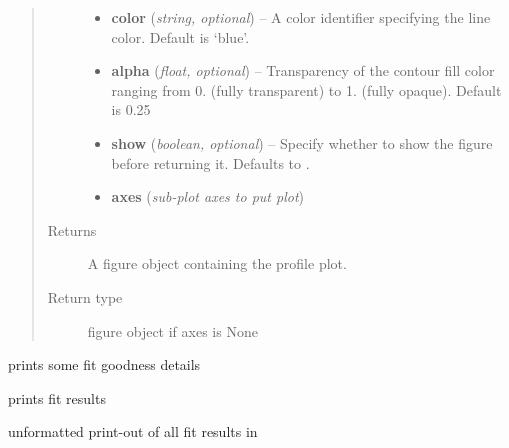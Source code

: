 \documentclass[a4paper,10pt,english]{sphinxmanual}
\begin{document}
\begin{fulllineitems}
\begin{fulllineitems}
\begin{quote}
\begin{description}
\begin{itemize}
\item {} 
\textbf{color} (\emph{string, optional}) --
A  color identifier specifying the line
color. Default is `blue'.

\item {} 
\textbf{alpha} (\emph{float, optional}) --
Transparency of the contour fill color ranging from 0. (fully
transparent) to 1. (fully opaque). Default is 0.25

\item {} 
\textbf{show} (\emph{boolean, optional}) --
Specify whether to show the figure before returning it. Defaults
to .

\item {} 
\textbf{axes} (\emph{sub-plot axes to put plot})

\end{itemize}

\item[{Returns}] \leavevmode
A figure object containing the profile plot.

\item[{Return type}] \leavevmode
{} figure object if axes is None

\end{description}\end{quote}

\end{fulllineitems}


\begin{fulllineitems}
\label{module_doc:kafe.fit.Fit.print_fit_details}
prints some fit goodness details

\end{fulllineitems}


\begin{fulllineitems}
\label{module_doc:kafe.fit.Fit.print_fit_results}
prints fit results

\end{fulllineitems}


\begin{fulllineitems}
\label{module_doc:kafe.fit.Fit.print_raw_results}
unformatted print-out of all fit results in


\end{fulllineitems}
\end{fulllineitems}
\end{document}
